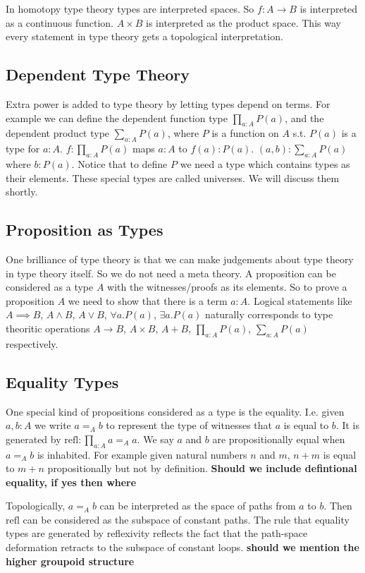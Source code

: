 \documentclass[10pt]{article}
\theoremstyle{definition}
\theoremstyle{plain}
\theoremstyle{remark}
\begin{document}
In homotopy type theory types are interpreted spaces. So $f : A \to B$ is 
interpreted as a continuous function. $A \times B$ is interpreted as the product space.
This way every statement in type theory gets a topological interpretation.

\subsection{Dependent Type Theory}
Extra power is added to type theory by letting types depend on terms. For example we can 
define the dependent function type $\prod_{a : A} P(a)$, and the dependent product type
$\sum_{a : A} P(a)$, where $P$ is a function on $A$ s.t. $P(a)$ is a type for $a : A$. 
$f : \prod_{a : A} P(a)$ maps $a : A$ to $f(a) : P(a)$. $(a,b) : \sum_{a : A} P(a)$ where
$b : P(a)$. Notice that to define $P$ we need a type which contains types as their elements.
These special types are called universes. We will discuss them shortly. 
 
\subsection{Proposition as Types}
One brilliance of type theory is that we can make judgements about type theory in type theory
itself. So we do not need a meta theory. A proposition can be considered as a type $A$ with 
the witnesses/proofs as its elements. So to prove a proposition $A$ we need to show that 
there is a term $a : A$. Logical statements like $A \implies B$, $A \wedge B$, $A \vee B$, 
$\forall a. P(a)$, $\exists a. P(a)$ naturally corresponds to type theoritic operations 
$A \to B$, $A \times B$, $A + B$, $\prod_{a : A} P(a)$, $\sum_{a : A} P(a)$
respectively.\smallskip

\subsection{Equality Types}
One special kind of propositions considered as a type is the equality. I.e. given $a,b : A$ we
write $a =_A b$ to represent the type of witnesses that $a$ is equal to $b$. It is
generated by $\text{refl} :\prod_{a : A} a =_A a$. We say $a$ and
$b$ are propositionally equal when $a =_A b$ is inhabited. For example given natural
numbers $n$ and $m$, $n+m$ is equal to $m+n$ propositionally but not by definition.
\textbf{Should we include defintional equality, if yes then where}
\smallskip

Topologically, $a =_A b$ can be interpreted as the space of paths from $a$ to $b$. Then 
$\text{refl}$ can be considered as the subspace of constant paths. The rule that equality
types are generated by reflexivity reflects the fact that the path-space deformation retracts
to the subspace of constant loops. \textbf{should we mention the higher groupoid structure	}
\end{document}
